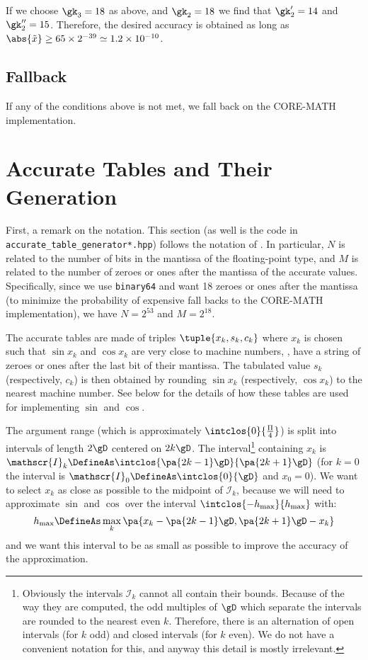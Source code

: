 \documentclass[10pt, a4paper, twoside]{basestyle}
\newcommand{\red}[1]{\tilde{#1}}
\begin{document}
If we choose $\gk_3 = 18$ as above, and $\gk_2 = 18$ we find that $\gk'_2 = 14$ and $\gk''_2 = 15$.  Therefore, the desired accuracy is obtained as long as $\abs{\red x} \geq 65 \times 2^{-39} \simeq 1.2 \times 10^{-10}$.

\subsection*{Fallback}

If any of the conditions above is not met, we fall back on the CORE-MATH implementation.

\section*{Accurate Tables and Their Generation}

First, a remark on the notation.  This section (as well is the code in \linebreak\texttt{accurate\_table\_generator*.hpp}) follows the notation of \cite{StehléZimmermann2005}.  In particular, $N$ is related to the number of bits in the mantissa of the floating-point type, and $M$ is related to the number of zeroes or ones after the mantissa of the accurate values.  Specifically, since we use \texttt{binary64} and want 18 zeroes or ones after the mantissa (to minimize the probability of expensive fall backs to the CORE-MATH implementation), we have $N = 2^{53}$ and $M = 2^{18}$. 

The accurate tables are made of triples $\tuple{x_k, s_k, c_k}$ where $x_k$ is chosen such that $\sin x_k$ and $\cos x_k$ are very close to machine numbers, \idest, have a string of zeroes or ones after the last bit of their mantissa.  The tabulated value $s_k$ (respectively, $c_k$) is then obtained by rounding $\sin x_k$ (respectively, $\cos x_k$) to the nearest machine number.  See  below for the details of how these tables are used for implementing $\sin$ and $\cos$.

The argument range (which is approximately $\intclos{0}{\frac{\Pi}{4}}$) is split into intervals of length $2 \gD$ centered on $2 k \gD$.  The interval\footnote{Obviously the intervals $\mathscr{I}_k$ cannot all contain their bounds.  Because of the way they are computed, the odd multiples of $\gD$ which separate the intervals are rounded to the nearest even $k$.  Therefore, there is an alternation of open intervals (for $k$ odd) and closed intervals (for $k$ even).  We do not have a convenient notation for this, and anyway this detail is mostly irrelevant.} containing $x_k$ is $\mathscr{I}_k \DefineAs \intclos{\pa{2 k - 1}\gD}{\pa{2 k + 1}\gD}$ (for $k = 0$ the interval is $\mathscr{I}_0 \DefineAs \intclos{0}{\gD}$ and $x_0 = 0$).  We want to select $x_k$ as close as possible to the midpoint of $\mathscr{I}_k$, because we will need to approximate $\sin$ and $\cos$ over the interval $\intclos{-h_{\text{max}}}{h_{\text{max}}}$ with:
\[
h_{\text{max}} \DefineAs \max_k \pa{x_k - \pa{2 k - 1} \gD, \pa{2 k + 1} \gD - x_k}
\]
and we want this interval to be as small as possible to improve the accuracy of the approximation.
\end{document}
